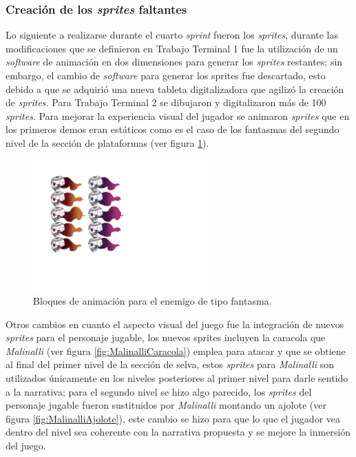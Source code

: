 \subsubsection{Creación de los \textit{sprites} faltantes}
Lo siguiente a realizarse durante el cuarto \textit{sprint} fueron los \textit{sprites}, 
durante las modificaciones que se definieron en Trabajo Terminal 1 fue la 
utilización de un \textit{software} de animación en dos dimensiones para generar 
los \textit{sprites} restantes; sin embargo, el cambio de \textit{software} para 
generar los sprites fue descartado, esto debido a que se adquirió una nueva 
tableta digitalizadora que agilizó la creación de \textit{sprites}. Para Trabajo 
Terminal 2 se dibujaron y digitalizaron más de 100 \textit{sprites}. Para mejorar 
la experiencia visual del jugador se animaron \textit{sprites} que en los primeros 
demos eran estáticos como es el caso de los fantasmas del segundo nivel de la 
sección de plataformas (ver figura \ref{fig:FantasmaAnimacion}). 

\begin{figure}[h]
	\centering
	\includegraphics[width=0.6\textwidth]{03TrabajoRealizado/imagenes/fantasmas.png}
 	\caption{Bloques de animación para el enemigo de tipo fantasma.}
	\label{fig:FantasmaAnimacion}		
\end{figure}

Otros cambios en cuanto el aspecto visual del juego fue la integración de nuevos 
\textit{sprites} para el personaje jugable, los nuevos sprites incluyen la 
caracola que \textit{Malinalli} (ver figura \ref{fig:MalinalliCaracola}) emplea 
para atacar y que se obtiene al final del primer nivel de la sección de selva, 
estos \textit{sprites} para \textit{Malinalli} son utilizados únicamente en los 
niveles posteriores al primer nivel para darle sentido a la narrativa; para el 
segundo nivel se hizo algo parecido, los \textit{sprites} del personaje jugable 
fueron sustituidos por \textit{Malinalli} montando un ajolote (ver figura 
\ref{fig:MalinalliAjolote}), este cambio se hizo para que lo que el jugador vea 
dentro del nivel sea coherente con la narrativa propuesta y se mejore la inmersión del juego. 

